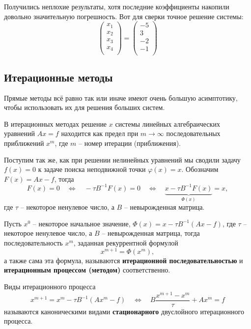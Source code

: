 \documentclass{article}
\begin{document}
\begin{example}
	Получились неплохие результаты, хотя последние коэффициенты накопили
	довольно значительную погрешность. Вот для сверки точное решение
	системы:
	\[
		\begin{pmatrix}
			x_1 \\
			x_2 \\
			x_3 \\
			x_4 \\
		\end{pmatrix}
		=
		\begin{pmatrix}
			-5 \\
			3 \\
			-2 \\
			-1 \\
		\end{pmatrix}
	\]
\end{example}

\subsection{Итерационные методы}
Прямые методы всё равно так или иначе имеют очень большую асимптотику, чтобы
использовать их для решения больших систем.

В итерационных методах решение $x$ системы линейных алгебраических уравнений
$Ax=f$ находится как предел при $m\to\infty$ последовательных приближений $x^m$,
где $m$ -- номер итерации (приближения).

Поступим так же, как при решении нелинейных уравнений мы сводили задачу $f(x)=0$
к задаче поиска неподвижной точки $\varphi(x)=x$. Обозначим $F(x)=Ax-f$, тогда
\[F(x)=0\quad\Leftrightarrow\quad -\tau B^{-1}F(x)=0\quad\Leftrightarrow\quad
\underset{\Phi(x)}{\underbrace{x-\tau B^{-1}F(x)}}=x,\]
где $\tau$ -- некоторое ненулевое число, а $B$ -- невырожденная матрица.

\begin{define}\label{eq:sle_iterative_method}
	Пусть $x^0$ -- некоторое начальное значение, $\Phi(x)=x-\tau
	B^{-1}(Ax-f)$, где $\tau$ -- некоторое ненулевое число, а $B$ --
	невырожденная матрица, тогда последовательность $x^m$, заданная
	рекуррентной формулой
	\[x^{m+1}=\Phi(x^m),\]
	а также сама эта формула, называются \textbf{итерационной
	последовательностью} и \textbf{итерационным процессом (методом)}
	соответственно.
\end{define}

\begin{define}\label{eq:static_canon_process}
	Виды итерационного процесса
	\[x^{m+1}=x^m-\tau B^{-1}(Ax^m-f)\quad\Leftrightarrow\quad
	B\frac{x^{m+1}-x^m}{\tau}+Ax^m=f\]
	называются каноническими видами \textbf{стационарного} двуслойного
	итерационного процесса.
\end{define}
\end{document}
